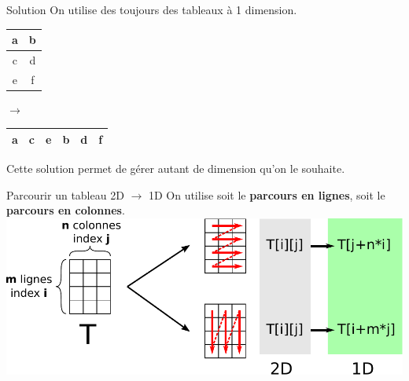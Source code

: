 \begin{frame}{Solution}
    On utilise des toujours des tableaux à 1 dimension.
    \begin{center}
        \begin{minipage}{0.2\linewidth}
        \begin{flushright}
        \begin{tabular}{|c|c|}
            \hline
            a & b\\
            \hline
            c & d\\
            \hline
            e & f\\
            \hline
        \end{tabular}
    \end{flushright}
        \end{minipage}
        \begin{minipage}{0.07\linewidth}
             \centering
        $\longrightarrow$
        \end{minipage}
        \begin{minipage}{0.5\linewidth}
        \begin{tabular}{|c|c|c|c|c|c|}
            \hline
            a & c & e &
            b & d & f \\
            \hline
        \end{tabular}
        \end{minipage}
    \end{center}
    Cette solution permet de gérer autant de dimension qu'on le souhaite.
\end{frame}

\begin{frame}{Parcourir un tableau 2D $\rightarrow$ 1D}
	On utilise soit le \textbf{parcours en lignes}, soit le \textbf{parcours en colonnes}.
    \includegraphics[width=\linewidth]{images/parcours.pdf}
\end{frame}

